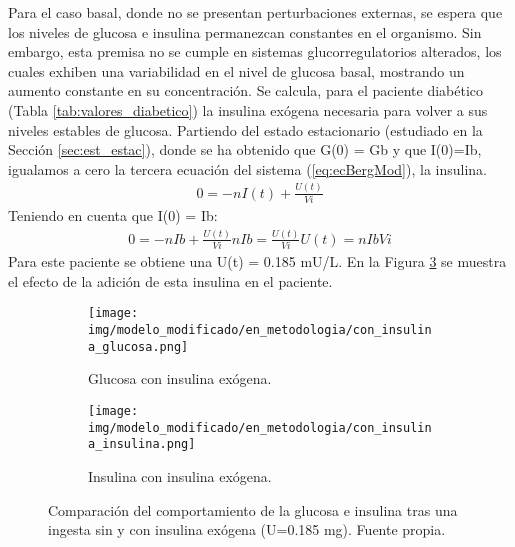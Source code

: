 Para el caso basal, donde no se presentan perturbaciones externas, se espera que los niveles de glucosa e insulina permanezcan constantes en el organismo. Sin embargo, esta premisa no se cumple en sistemas glucorregulatorios alterados, los cuales exhiben una variabilidad en el nivel de glucosa basal, mostrando un aumento constante en su concentración. Se calcula, para el paciente diabético (Tabla \ref{tab:valores_diabetico}) la insulina exógena necesaria para volver a sus niveles estables de glucosa. Partiendo del estado estacionario (estudiado en la Sección \ref{sec:est_estac}), donde se ha obtenido que G(0) = Gb y que I(0)=Ib, igualamos a cero la tercera ecuación del sistema (\ref{eq:ecBergMod}), la insulina.
\begin{align}
    0= -n I(t) + \frac{U(t)}{Vi}
\end{align}
Teniendo en cuenta que I(0) = Ib:
\begin{align}
    0= -n Ib + \frac{U(t)}{Vi}
    n Ib = \frac{U(t)}{Vi}
    U(t) = n Ib Vi
\end{align}
\label{sec:insulina_calculo}
Para este paciente  se obtiene una U(t) = 0.185 mU/L. En la Figura \ref{fig:modificado_comportamiento_insulina_exogena} se muestra el efecto de la adición de esta insulina en el paciente.
\label{sec:dosis_insu_base}
\clearpage
\begin{figure}[htbp]
    \centering
    \begin{subfigure}[b]{0.9\linewidth} %
        \centering
        \texttt{[image: img/modelo\_modificado/en\_metodologia/con\_insulina\_glucosa.png]}
        \caption{Glucosa con insulina exógena.}
        \label{fig:mod_ayuno}
    \end{subfigure}
    
    \vspace{0.5cm} %

    \begin{subfigure}[b]{0.9\linewidth} %
        \centering
        \texttt{[image: img/modelo\_modificado/en\_metodologia/con\_insulina\_insulina.png]}
        \caption{Insulina con insulina exógena.}
        \label{fig:mode_ayuno_insu}
    \end{subfigure}
    
    \caption{Comparación del comportamiento de la glucosa e insulina tras una ingesta sin y con insulina exógena (U=0.185 mg). Fuente propia.}
    \label{fig:modificado_comportamiento_insulina_exogena}
\end{figure}


